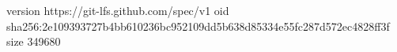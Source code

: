 version https://git-lfs.github.com/spec/v1
oid sha256:2e109393727b4bb610236bc952109dd5b638d85334e55fc287d572ec4828ff3f
size 349680
